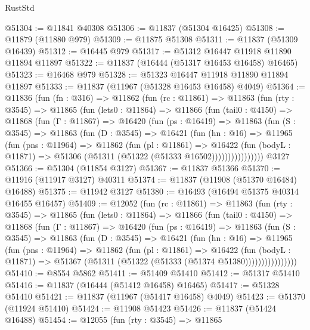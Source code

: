 \begin{lexlean}{RustStd}
\begin{coremodule}
@51304 := @11841 @40308
@51306 := @11837 (@51304 @16425)
@51308 := @11879 (@11880 @979)
@51309 := @11875 @51308
@51311 := @11837 (@51309 @16439)
@51312 := @16445 @979
@51317 := @51312 @16447 @11918 @11890 @11894 @11897
@51322 := @11837 (@16444 (@51317 @16453 @16458) @16465)
@51323 := @16468 @979
@51328 := @51323 @16447 @11918 @11890 @11894 @11897
@51333 := @11837 (@11967 (@51328 @16453 @16458) @4049)
@51364 := @11836
    (fun (fn : @316) =>
    @11862
      (fun (rc : @11861) =>
      @11863
        (fun (rty : @3545) =>
        @11865
          (fun (lets0 : @11864) =>
          @11866
            (fun (tail0 : @4150) =>
            @11868
              (fun (Γ : @11867) =>
              @16420
                (fun (ps : @16419) =>
                @11863
                  (fun (S : @3545) =>
                  @11863
                    (fun (D : @3545) =>
                    @16421
                      (fun (hn : @16) =>
                      @11965
                        (fun (pns : @11964) =>
                        @11862
                          (fun (pl : @11861) =>
                          @16422
                            (fun (bodyL : @11871) =>
                            @51306 (@51311 (@51322 (@51333 @16502))))))))))))))))
    @3127
@51366 := @51304 (@11854 @3127)
@51367 := @11837 @51366
@51370 := @11916 (@11917 @3127) @40311
@51374 := @11837 (@11908 (@51370 @16484) @16488)
@51375 := @11942 @3127
@51380 := @16493 (@16494 @51375 @40314 @16455 @16457)
@51409 := @12052
    (fun (rc : @11861) =>
    @11863
      (fun (rty : @3545) =>
      @11865
        (fun (lets0 : @11864) =>
        @11866
          (fun (tail0 : @4150) =>
          @11868
            (fun (Γ : @11867) =>
            @16420
              (fun (ps : @16419) =>
              @11863
                (fun (S : @3545) =>
                @11863
                  (fun (D : @3545) =>
                  @16421
                    (fun (hn : @16) =>
                    @11965
                      (fun (pns : @11964) =>
                      @11862
                        (fun (pl : @11861) =>
                        @16422
                          (fun (bodyL : @11871) =>
                          @51367 (@51311 (@51322 (@51333 (@51374 @51380))))))))))))))))
@51410 := @8554 @5862
@51411 := @51409 @51410
@51412 := @51317 @51410
@51416 := @11837 (@16444 (@51412 @16458) @16465)
@51417 := @51328 @51410
@51421 := @11837 (@11967 (@51417 @16458) @4049)
@51423 := @51370 (@11924 @51410)
@51424 := @11908 @51423
@51426 := @11837 (@51424 @16488)
@51454 := @12055
    (fun (rty : @3545) =>
    @11865

\end{coremodule}
\end{lexlean}
